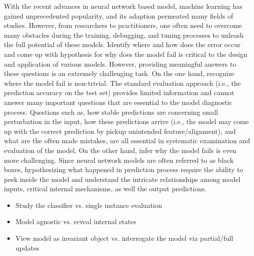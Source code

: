 \maketitle

With the recent advances in neural network based model, machine learning has
gained unprecedented popularity, and its adaption permeated many fields of studies.
%
However, from researchers to practitioners, one often need to overcome many
obstacles during the training, debugging, and tuning processes to unleash
the full potential of these models.
%
Identify where and how does the error occur and come up with hypothesis for
why does the model fail is critical to the design and application of various models.
However, providing meaningful answers to these questions is an extremely challenging task.
On the one hand, recognize where the model fail is non-trivial. The standard evaluation approach (i.e., the prediction accuracy on the test set) provides limited information and cannot answer many important questions that are essential to the model diagnostic process. Questions such as, how stable predictions are concerning small perturbation in the input, how these predictions arrive (i.e., the model may come up with the correct prediction by pickup unintended feature/alignment), and what are the often made mistakes, are all essential in systematic examination and evaluation of the model. On the other hand, infer why the model fails is even more challenging. Since neural network models are often referred to as black boxes, hypothesizing what happened in prediction process require the ability to peek inside the model and understand the intricate relationships among model inputs, critical internal mechanisms, as well the output predictions.

\begin{itemize}
    \item Study the classifier  vs. single instance evaluation
    \item Model agnostic vs. reveal internal states
    \item View model as invariant object vs. interrogate the model via partial/full updates
\end{itemize}

